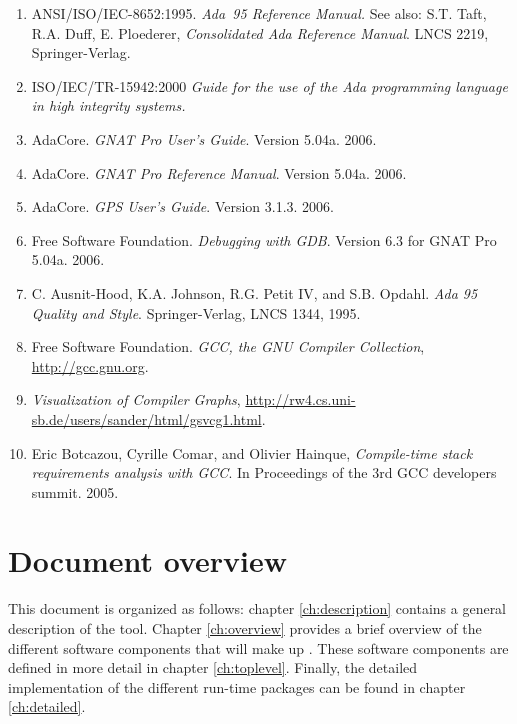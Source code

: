 \begin{enumerate}[{R}1.]
\item \label{ALRM}
   ANSI/ISO/IEC-8652:1995. \textit{Ada~95 Reference Manual.}
   See also: S.T. Taft, R.A. Duff, E. Ploederer, \textit{Consolidated
     Ada Reference Manual}. LNCS 2219, Springer-Verlag.
\item  \label{HIS}
   ISO/IEC/TR-15942:2000 \textit{Guide for the use of the Ada programming
   language in high integrity systems.} 
\item \label{GNATUG}
      AdaCore. \textit{GNAT Pro User's Guide}. Version 5.04a. 2006.
\item \label{GNATRM}
      AdaCore. \textit{GNAT Pro Reference Manual}. Version 5.04a. 2006.
\item \label{GPS}
      AdaCore. \textit{GPS User's Guide}. Version 3.1.3. 2006.
\item \label{GDB}
      Free Software Foundation. \textit{Debugging with GDB}. Version 6.3 for GNAT Pro 5.04a. 2006.
\item \label{AdaQS}
  C. Ausnit-Hood, K.A. Johnson, R.G. Petit IV, and S.B. Opdahl.
  \textit{Ada 95 Quality and Style}.
  Springer-Verlag, LNCS 1344, 1995.
\item \label{GCC}
      Free Software Foundation. \textit{GCC, the GNU Compiler Collection}, \url{http://gcc.gnu.org}.
\item \label{VCG}
      \textit{Visualization of Compiler Graphs}, \url{http://rw4.cs.uni-sb.de/users/sander/html/gsvcg1.html}.
\item \label{GCCSTACK}
      Eric Botcazou, Cyrille Comar, and Olivier Hainque, \textit{Compile-time stack requirements analysis with GCC}. In Proceedings of the 3rd GCC developers summit. 2005.
\end{enumerate}

\section{Document overview}

This document is organized as follows:
chapter \ref{ch:description} contains a general description of the
tool. Chapter \ref{ch:overview} provides a brief overview of the
different software components that will make up \ssat{}. These
software components are defined in more detail in chapter
\ref{ch:toplevel}. Finally, the detailed implementation of the
different run-time packages can be found in chapter \ref{ch:detailed}.

